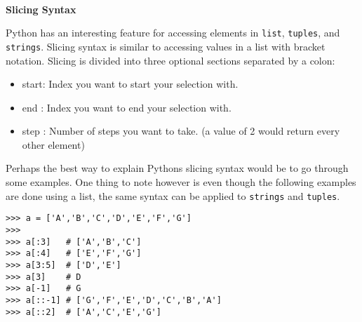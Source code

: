 \documentclass[letterpaper,11pt]{article}
\begin{document}
\\
\textbf{Slicing Syntax}
\par{Python has an interesting feature for accessing elements in \texttt{list},
\texttt{tuples}, and \texttt{strings}. Slicing syntax is similar to accessing
values in a list with bracket notation. Slicing is divided into three optional
sections separated by a colon:}
\begin{itemize}
    \setlength\itemsep{1pt}
    \item start: Index you want to start your selection with.
    \item end  : Index you want to end your selection with.
    \item step : Number of steps you want to take. (a value of 2 would return
        every other element)
\end{itemize}
\par{Perhaps the best way to explain Pythons slicing syntax would be to go
through some examples. One thing to note however is even though the following
examples are done using a list, the same syntax can be applied to
\texttt{strings} and \texttt{tuples}.}
\\
\begin{minipage}{.75\textwidth}
    \begin{tcolorbox}
        \begin{footnotesize}
            \begin{verbatim}
>>> a = ['A','B','C','D','E','F','G']
>>>
>>> a[:3]   # ['A','B','C']
>>> a[:4]   # ['E','F','G']
>>> a[3:5]  # ['D','E']
>>> a[3]    # D
>>> a[-1]   # G
>>> a[::-1] # ['G','F','E','D','C','B','A']
>>> a[::2]  # ['A','C','E','G']
            \end{verbatim}
        \end{footnotesize}
    \end{tcolorbox}
\end{minipage}
\end{document}
